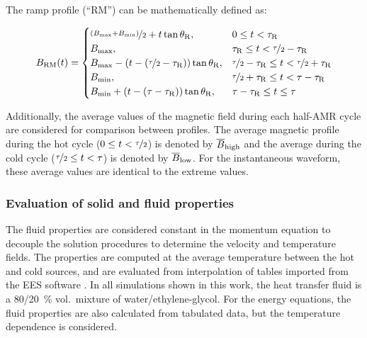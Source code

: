 \documentclass[referee]{svjour3}
\begin{document}

The ramp profile (``RM'') can be mathematically defined as:

\begin{equation}
{B}_{\mathrm{RM}}(t)=
\begin{cases}
\nicefrac{\left({B}_{\mathrm{max}} + {B}_{\mathrm{min}}\right)}{2} + t \tan \theta_{\mathrm{R}} , & 0 \le t < \tau_{\mathrm{R}} \\
{B}_{\mathrm{max}}, & \tau_{\mathrm{R}} \le t < \nicefrac{\tau}{2} - \tau_{\mathrm{R}}\\
{B}_{\mathrm{max}} - \left(t - \left(\nicefrac{\tau}{2} - \tau_{\mathrm{R}}\right)\right) \tan \theta_{\mathrm{R}} , & \nicefrac{\tau}{2} - \tau_{\mathrm{R}} \le t < \nicefrac{\tau}{2} + \tau_{\mathrm{R}} \\
{B}_{\mathrm{min}}, & \nicefrac{\tau}{2} + \tau_{\mathrm{R}} \le t < \tau - \tau_{\mathrm{R}}\\
{B}_{\mathrm{min}} + \left(t - \left(\tau - \tau_{\mathrm{R}}\right)\right) \tan \theta_{\mathrm{R}} , & \tau - \tau_{\mathrm{R}} \le t \le \tau \\
\end{cases}
\label{eq:203}
\end{equation}


Additionally, the average values of the magnetic field during each half-AMR cycle are considered for comparison between profiles. The average magnetic profile during the hot cycle ($0 \le t < \nicefrac{\tau}{2}$) is denoted by $\overline{B}_{\mathrm{high}}$ and the average during the cold cycle  ($ \nicefrac{\tau}{2} \le t < \tau$) is denoted by $\overline{B}_{\mathrm{low}}$. For the instantaneous waveform, these average values are identical to the extreme values.

\subsubsection{Evaluation of solid and fluid properties}
\label{sec:eval-solid-fluid}

The fluid properties are considered constant in the momentum equation to decouple the solution procedures to determine the velocity and temperature fields. The properties are computed at the average temperature between the hot and cold sources, and are evaluated from interpolation of tables imported from the EES software \cite{bib:klein13-ees}. In all simulations shown in this work, the heat transfer fluid is a \num{80}/\SI{20}{\percent} vol.~mixture of water/ethylene-glycol. For the energy equations, the fluid properties are also calculated from tabulated data, but the temperature dependence is considered.
\end{document}
